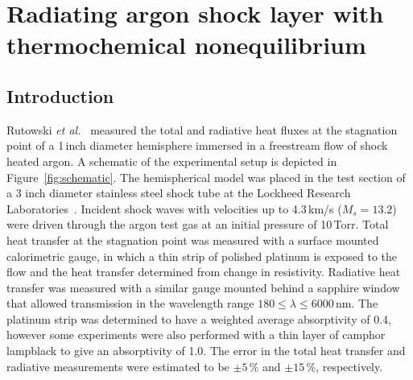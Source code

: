 
\section{Radiating argon shock layer with thermochemical nonequilibrium}
\label{sec:}
%

\subsection{Introduction}

Rutowski \textit{et al.}~\cite{RB64} measured the total and radiative heat fluxes at the stagnation point of a 1\,inch diameter hemisphere immersed in a freestream flow of shock heated argon.
A schematic of the experimental setup is depicted in Figure~\ref{fig:schematic}.
The hemispherical model was placed in the test section of a 3 inch diameter stainless steel shock tube at the Lockheed Research Laboratories~\cite{MBR+62}.  
Incident shock waves with velocities up to 4.3\,km/s ($M_s = 13.2$) were driven through the argon test gas at an initial pressure of 10\,Torr.
Total heat transfer at the stagnation point was measured with a surface mounted calorimetric gauge, in which a thin strip of polished platinum is exposed to the flow and the heat transfer determined from change in resistivity.
Radiative heat transfer was measured with a similar gauge mounted behind a sapphire window that allowed transmission in the wavelength range $180 \leq \lambda \leq 6000$\,nm.
The platinum strip was determined to have a weighted average absorptivity of 0.4, however some experiments were also performed with a thin layer of camphor lampblack to give an absorptivity of 1.0.
The error in the total heat transfer and radiative measurements were estimated to be $\pm 5$\,\% and $\pm 15$\,\%, respectively. 
 


